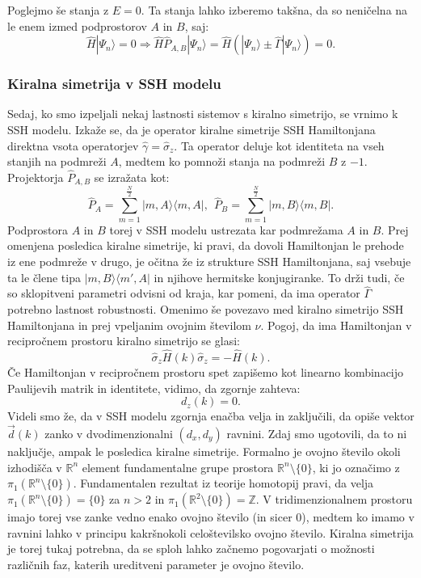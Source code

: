 Poglejmo še stanja z $E = 0$. Ta stanja lahko izberemo takšna, da so neničelna na le enem izmed podprostorov $A$ in $B$, saj:
\begin{equation}
\hat{H} | \Psi_n \rangle = 0  \Rightarrow  \hat{H} \hat{P}_{A,B} |\Psi_n \rangle = \hat{H} ( | \Psi_n \rangle \pm \hat{\Gamma} | \Psi_n \rangle ) = 0.
\end{equation}

\subsubsection{Kiralna simetrija v SSH modelu}
Sedaj, ko smo izpeljali nekaj lastnosti sistemov s kiralno simetrijo, se vrnimo k SSH modelu.
Izkaže se, da je operator kiralne simetrije SSH Hamiltonjana direktna vsota operatorjev $\hat{\gamma} = \hat{\sigma}_z$. Ta operator deluje kot identiteta na vseh stanjih na podmreži $A$, medtem ko pomnoži stanja na podmreži $B$ z $-1$.
Projektorja $\hat{P}_{A,B}$ se izražata kot:
\begin{equation}
\hat{P}_A = \sum_{m=1}^{\frac{N}{2}}  | m, A \rangle \langle m, A |, \ \ \hat{P}_B = \sum_{m=1}^{\frac{N}{2}}  | m, B \rangle \langle m, B |.
\end{equation}
Podprostora $A$ in $B$ torej v SSH modelu ustrezata kar podmrežama $A$ in $B$.
Prej omenjena posledica kiralne simetrije, ki pravi, da dovoli Hamiltonjan le prehode iz ene podmreže v drugo, je očitna že iz strukture SSH Hamiltonjana, saj vsebuje ta le člene tipa $ |m, B \rangle \langle m' , A | $ in njihove hermitske konjugiranke. To drži tudi, če so sklopitveni parametri odvisni od kraja, kar pomeni, da ima operator $\hat{\Gamma}$ potrebno lastnost robustnosti.
Omenimo še povezavo med kiralno simetrijo SSH Hamiltonjana in prej vpeljanim ovojnim številom $\nu$.
Pogoj, da ima Hamiltonjan v recipročnem prostoru kiralno simetrijo se glasi: 
\begin{equation}
\hat{\sigma}_z \hat{H}(k) \hat{\sigma}_z = - \hat{H}(k).
\end{equation}
Če Hamiltonjan v recipročnem prostoru spet zapišemo kot linearno kombinacijo Paulijevih matrik in identitete, vidimo, da zgornje zahteva:
\begin{equation}
d_z (k) = 0.
\end{equation}
Videli smo že, da v SSH modelu zgornja enačba velja in zaključili, da opiše vektor $\vec{d}(k)$ zanko v dvodimenzionalni $(d_x, d_y)$ ravnini. Zdaj smo ugotovili, da to ni naključje, ampak le posledica kiralne simetrije. Formalno je ovojno število okoli izhodišča v $\mathbb{R}^n$ element fundamentalne grupe prostora $\mathbb{R}^n \setminus \{0\}$, ki jo označimo z $\pi_1 ( \mathbb{R}^n \setminus \{0 \})$. Fundamentalen rezultat iz teorije homotopij \cite{hatcher} pravi, da velja  $\pi_1 ( \mathbb{R}^n \setminus \{0 \}) = \{ 0 \}$ za $n>2$  in  $\pi_1 ( \mathbb{R}^2 \setminus \{0 \}) = \mathbb{Z}$.
V tridimenzionalnem prostoru imajo torej vse zanke vedno enako ovojno število (in sicer $0$), medtem ko imamo v ravnini lahko v principu kakršnokoli celoštevilsko ovojno število. Kiralna simetrija je torej tukaj potrebna, da se sploh lahko začnemo pogovarjati o možnosti različnih faz, katerih ureditveni parameter je ovojno število.

